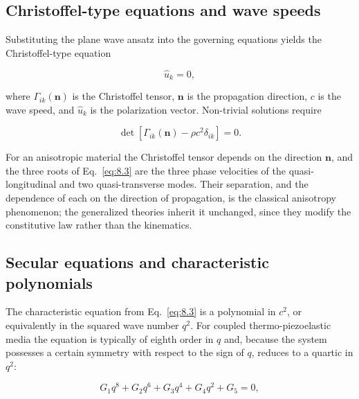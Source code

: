 \subsection{Christoffel-type equations and wave speeds}
\label{sec:8.2}

Substituting the plane wave ansatz into the governing equations yields the Christoffel-type equation

\begin{equation}
[\Gamma_{ik}(\bm{n}) - \rho c^2 \delta_{ik}]\hat{u}_k = 0,
\label{eq:8.2}
\end{equation}

where $\Gamma_{ik}(\bm{n})$ is the Christoffel tensor, $\bm{n}$ is the propagation direction, $c$ is the wave speed, and $\hat{u}_k$ is the polarization vector. Non-trivial solutions require

\begin{equation}
\det[\Gamma_{ik}(\bm{n}) - \rho c^2 \delta_{ik}] = 0.
\label{eq:8.3}
\end{equation}

For an anisotropic material the Christoffel tensor depends on the direction $\bm{n}$, and the three roots of Eq.~\eqref{eq:8.3} are the three phase velocities of the quasi-longitudinal and two quasi-transverse modes. Their separation, and the dependence of each on the direction of propagation, is the classical anisotropy phenomenon; the generalized theories inherit it unchanged, since they modify the constitutive law rather than the kinematics.

\subsection{Secular equations and characteristic polynomials}
\label{sec:8.3}

The characteristic equation from Eq.~\eqref{eq:8.3} is a polynomial in $c^2$, or equivalently in the squared wave number $q^2$. For coupled thermo-piezoelastic media the equation is typically of eighth order in $q$ and, because the system possesses a certain symmetry with respect to the sign of $q$, reduces to a quartic in $q^2$:

\begin{equation}
G_1 q^8 + G_2 q^6 + G_3 q^4 + G_4 q^2 + G_5 = 0,
\label{eq:8.4}
\end{equation}

